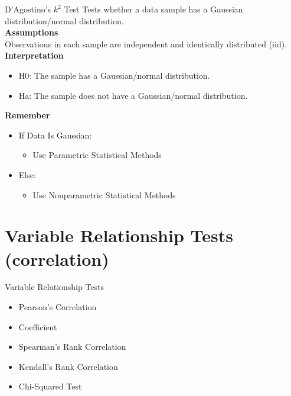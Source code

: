 \begin{frame}[t]{D’Agostino’s $k^{2}$ Test}
	Tests whether a data sample has a Gaussian distribution/normal distribution. \\
	\textbf{Assumptions}\\
	Observations in each sample are independent and identically distributed (iid).\\
	\textbf{Interpretation}	\\
	\begin{itemize}
		\item H0: The sample has a Gaussian/normal distribution.
		\item Ha: The sample does not have a Gaussian/normal distribution.
	\end{itemize}

	\textbf{Remember} \\
	\begin{itemize}
	\item If Data Is Gaussian:
		\begin{itemize}
			\item Use Parametric Statistical Methods
		\end{itemize}
	\item Else:
	\begin{itemize}
		\item Use Nonparametric Statistical Methods
	\end{itemize}
	\end{itemize}
\end{frame}
\section{Variable Relationship Tests (correlation)}
\begin{frame}[t]{Variable Relationship Tests}
	\begin{itemize}
		\item Pearson’s Correlation 
		\item Coefficient
		\item Spearman’s Rank Correlation
		\item Kendall’s Rank Correlation
		\item Chi-Squared Test
	\end{itemize}
\end{frame}

